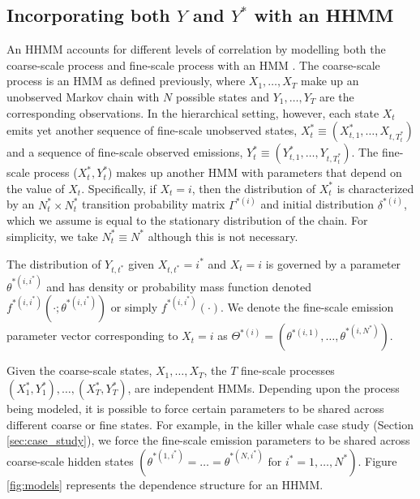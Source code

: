 \subsection{Incorporating both $Y$ and $Y^*$ with an HHMM}

An HHMM accounts for different levels of correlation by modelling both the coarse-scale process and fine-scale process with an HMM \citep{Barajas:2017,Adam:2019}. The coarse-scale process is an HMM as defined previously, where $X_1, \ldots, X_T$ make up an unobserved Markov chain with $N$ possible states and $Y_1,\ldots, Y_T$ are the corresponding observations.   
%
In the hierarchical setting, however, each state $X_t$ emits yet another sequence of fine-scale unobserved states, $X_t^* \equiv (X_{t,1}^*,\ldots, X_{t,T_t^*})$ and a sequence of fine-scale observed emissions, $Y_t^* \equiv (Y_{t,1}^*,\ldots, Y_{t,T_t^*})$. The fine-scale process ($X_t^*, Y_t^*$) makes up another HMM with parameters that depend on the value of $X_t$. Specifically, if $X_t=i$, then the distribution of $X_t^*$ is characterized by an $N^*_t \times N^*_t$ transition probability matrix $\Gamma^{*(i)}$ and initial distribution $\delta^{*(i)}$, which we assume is equal to the stationary distribution of the chain. For simplicity, we take $N_t^* \equiv N^*$ although this is not necessary.

The distribution of $Y_{t, t^*}$ given $X_{t, t^*}=i^*$ and $X_t=i$ is governed by a parameter $\theta^{*(i,i^*)}$ and has density or probability mass function denoted $f^{*(i,i^*)}\left(\cdot; \theta^{*(i,i^*)}\right)$ or simply $f^{*(i,i^*)}(\cdot)$. We denote the fine-scale emission parameter vector corresponding to $X_t=i$ as $\Theta^{*(i)}=\left(\theta^{*(i,1)}, \ldots, \theta^{*(i,N^*)}\right)$.

Given the coarse-scale states, $X_1,\ldots, X_T$, the $T$ fine-scale processes $(X_1^*, Y_1^*), \ldots, (X_T^*, Y_T^*)$, are independent HMMs. Depending upon the process being modeled, it is possible to force certain parameters to be shared across different coarse or fine states. For example, in the killer whale case study (Section \ref{sec:case_study}), we force the fine-scale emission parameters to be shared across coarse-scale hidden states $\left( \theta^{*(1,i^*)} = \ldots = \theta^{*(N,i^*)} \text{ for } i^* = 1, \ldots, N^* \right)$. Figure \ref{fig:models} represents the dependence structure for an HHMM.


